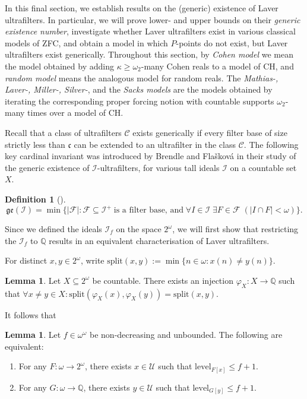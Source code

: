 \documentclass[12pt]{article}
\theoremstyle{definition}
\newtheorem{lem}[nummer]{\sc Lemma}
\newtheorem{defi}[nummer]{\sc Definition}
\renewcommand{\phi}{\varphi}
\newcommand\level{\text{level}}
\begin{document}
In this final section, we establish results on the (generic) existence of Laver ultrafilters. In particular, we will prove lower- and upper bounds on their \emph{generic existence number}, investigate whether Laver ultrafilters exist in various classical models of \textsf{ZFC}, and obtain a model in which $P$-points do not exist, but Laver ultrafilters exist generically. Throughout this section, by \emph{Cohen model} we mean the model obtained by adding $\kappa\geq\omega_2$-many Cohen reals to a model of \textsf{CH}, and \emph{random model} means the analogous model for random reals. The \emph{Mathias-, Laver-, Miller-, Silver-}, and the \emph{Sacks models} are the models obtained by iterating the corresponding proper forcing notion with countable supports $\omega_2$-many times over a model of \textsf{CH}.

Recall that a class of ultrafilters $\mathcal{C}$ exists generically if every filter base of size strictly less than $\mathfrak{c}$ can be extended to an ultrafilter in the class $\mathcal{C}$. The following key cardinal invariant was introduced by Brendle and Fla\v{s}kov\'a \cite{brefla17} in their study of the generic existence of $\mathcal{I}$-ultrafilters, for various tall ideals $\mathcal{I}$ on a countable set $X$.

\begin{defi}[\cite{brefla17}]
    $$\mathfrak{ge}(\mathcal{I})=\min\{|\mathcal{F}| : \mathcal{F}\subseteq \mathcal{I}^+ \; \text{is a filter base, and} \; \forall I\in\mathcal{I} \; \exists F\in\mathcal{F} \; (|I\cap F|<\omega)\}.$$
\end{defi}

Since we defined the ideals $\mathcal{I}_f$ on the space $2^\omega$, we will first show that restricting the $\mathcal{I}_f$ to $\mathbb{Q}$ results in an equivalent characterisation of Laver ultrafilters.

For distinct $x,y\in 2^\omega$, write $\text{split}(x,y):=\min\{n \in \omega: x(n)\neq y(n)\}$.

\begin{lem}\label{lem:redefinition}
Let $X \subseteq 2^\omega$ be countable. There exists an injection $\phi_X: X \to \mathbb{Q}$ such that $\forall x \neq y \in X: \text{split}(\phi_X(x),\phi_X(y))= \text{split}(x,y)$.	
\end{lem}

It follows that

\begin{lem}
Let $f\in \omega^\omega$ be non-decreasing and unbounded. The following are equivalent:
\begin{enumerate}[label=(\roman*)]
\item For any $F: \omega \to 2^\omega$, there exists $x\in \mathcal{U}$ such that $\level_{F[x]}\leq f+1$.
\item For any $G: \omega \to \mathbb{Q}$, there exists $y\in \mathcal{U}$ such that $\level_{G[y]}\leq f+1$.
\end{enumerate}
\end{lem}
\end{document}
